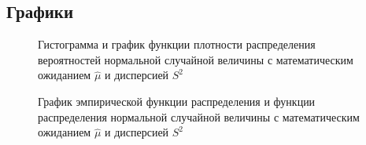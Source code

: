 \newpage

\subsection{Графики}

\begin{figure}[!h]
 \caption{Гистограмма и график функции плотности распределения вероятностей нормальной случайной величины с математическим ожиданием $\hat\mu$ и дисперсией $S^2$}
\end{figure}

\begin{figure}[!h]
 \caption{График эмпирической функции распределения и функции распределения нормальной случайной величины с математическим ожиданием $\hat\mu$ и дисперсией $S^2$}
\end{figure}



\newpage